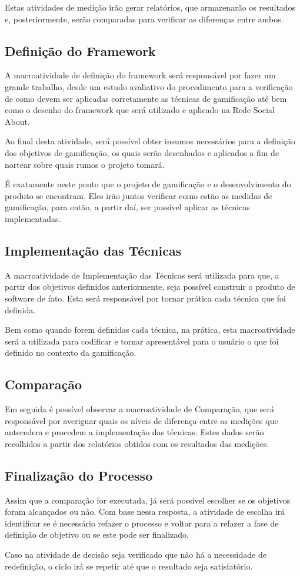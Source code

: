 Estas atividades de medição irão gerar relatórios, que armazenarão os resultados
e, posteriormente, serão comparadas para verificar as diferenças entre ambos.

\subsection{Definição do Framework}
\label{sub:definicaoframework}
A macroatividade de definição do framework será responsável por fazer um grande
trabalho, desde um estudo avaliativo do procedimento para a verificação de como
devem ser aplicadas corretamente as técnicas de gamificação até bem como o desenho
do framework que será utilizado e aplicado na Rede Social About.

Ao final desta atividade, será possível obter insumos necessários para a definição
dos objetivos de gamificação, os quais serão desenhados e aplicados a fim
de nortear sobre quais rumos o projeto tomará.

É exatamente neste ponto que o projeto de gamificação e o desenvolvimento do produto
se encontram. Eles irão juntos verificar como estão as medidas de gamificação, para
então, a partir daí, ser possível aplicar as técnicas implementadas.

\subsection{Implementação das Técnicas}
\label{sub:implematationtechnics}
A macroatividade de Implementação das Técnicas será utilizada para que, a partir
dos objetivos definidos anteriormente, seja possível construir o produto de software
de fato. Esta será responsável por tornar prática
cada técnica que foi definida.

Bem como quando forem definidas cada técnica, na prática, esta macroatividade
será a utilizada para codificar e tornar apresentável para o usuário o que
foi definido no contexto da gamificação.

\subsection{Comparação}
\label{sub:Comparacao}
Em seguida é possível observar a macroatividade de Comparação, que será
responsável por averiguar quais os níveis de diferença entre as medições que
antecedem e procedem a implementação das técnicas. Estes dados serão recolhidos a
partir dos relatórios obtidos com os resultados das medições.

\subsection{Finalização do Processo}
\label{sub:finalprocess}
Assim que a comparação for executada, já será possível escolher se os objetivos
foram alcançados ou não. Com base nessa resposta, a atividade de escolha irá
identificar se é necessário refazer o processo e voltar para a refazer a fase
de definição de objetivo ou se este pode ser finalizado.

Caso na atividade de decisão seja verificado que não há a necessidade de
redefinição, o ciclo irá se repetir até que o resultado seja satisfatório.

